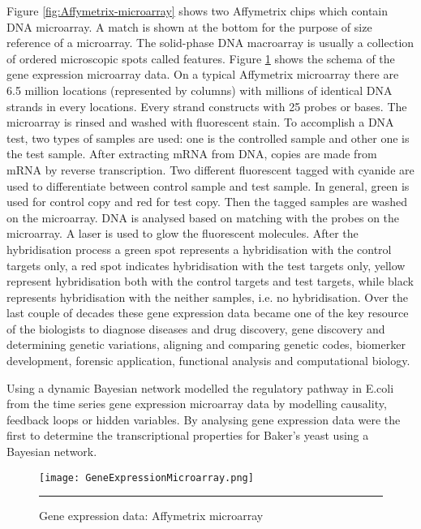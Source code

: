 Figure \ref{fig:Affymetrix-microarray} shows two Affymetrix chips which contain DNA microarray. A match is shown at the bottom for the purpose of size reference of a microarray. The solid-phase DNA macroarray is usually a collection of ordered microscopic spots called features. Figure \ref{fig:Gene Expression Microarray} shows the schema of the gene expression microarray data. On a typical Affymetrix microarray there are 6.5 million locations (represented by columns) with millions of identical DNA strands in every locations. Every strand constructs with 25 probes or bases. The microarray is rinsed and washed with fluorescent stain. To accomplish a DNA test, two types of samples are used: one is the controlled sample and other one is the test sample. After extracting mRNA from DNA, copies are made from mRNA by reverse transcription. Two different fluorescent tagged with cyanide are used to differentiate between control sample and test sample. In general, green is used for control copy and red for test copy. Then the tagged samples are washed on the microarray. DNA is analysed based on matching with the probes on the microarray. A laser is used to glow the fluorescent molecules. After the hybridisation process a green spot represents a hybridisation with the control targets only, a red spot indicates hybridisation with the test targets only, yellow represent hybridisation both with the control targets and test targets, while black represents hybridisation with the neither samples, i.e. no hybridisation. Over the last couple of decades these gene expression data became one of the key resource of the biologists to diagnose diseases and drug discovery, gene discovery and determining genetic variations, aligning and comparing genetic codes, biomerker development, forensic application, functional analysis and computational biology.

Using a dynamic Bayesian network \cite{Ong:2002} modelled the regulatory pathway in E.coli from the time series gene expression microarray data by modelling causality, feedback loops or hidden variables. By analysing gene expression data \cite{Friedman:2000} were the first to determine the  transcriptional properties for Baker's yeast using a Bayesian network.

\begin{figure}[t]
	\centering
	\texttt{[image: GeneExpressionMicroarray.png]}
		\rule{35em}{0.5pt}
	\caption{Gene expression data: Affymetrix microarray}
	\label{fig:Gene Expression Microarray}
\end{figure}

